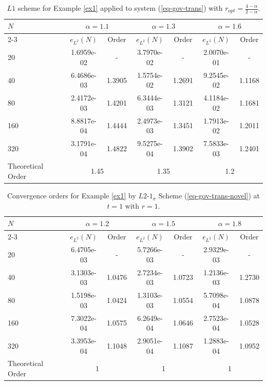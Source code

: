 \documentclass[11pt]{article}
\numberwithin{equation}{section}
\begin{document}
\begin{table}[!ht]
\caption{$L1$ scheme for Example \ref{ex1} applied to system (\ref{eq-gov-trans}) with $r_{opt}=\frac{4-\alpha}{2-\alpha}$.}\label{table2}
\renewcommand{\arraystretch}{1}
\def\temptablewidth{0.95\textwidth}
\begin{center}
 \begin{tabular*}{\temptablewidth}{@{\extracolsep{\fill}}lcccccc}\hline
 $N$  &\multicolumn{2}{c}{$\alpha=1.1$} &\multicolumn{2}{c}{$\alpha=1.3$} &\multicolumn{2}{c}{$\alpha=1.6$}\\
 \cline{2-3}\cline{4-5}\cline{6-7}
 & $e_{L^{2}}(N)$         &Order     &$e_{L^{2}}(N)$    &Order    &$e_{L^{2}}(N)$ &Order     \\ \hline  
 20  &1.6959e-02   &-       &3.7970e-02   &-        &2.0070e-01  &-    \\
 40  &6.4686e-03   &1.3905  &1.5754e-02   &1.2691   &9.2545e-02  &1.1168 \\
 80  &2.4172e-03   &1.4201  &6.3444e-03   &1.3121   &4.1184e-02  &1.1681    \\
 160 &8.8817e-04   &1.4444  &2.4973e-03   &1.3451   &1.7913e-02  &1.2011    \\
 320 &3.1791e-04   &1.4822  &9.5275e-04   &1.3902   &7.5833e-03  &1.2401    \\\hline
 Theoretical Order
 &\multicolumn{2}{c}{1.45} &\multicolumn{2}{c}{1.35}&\multicolumn{2}{c}{1.2}\\ \hline
\end{tabular*}
\end{center}
\end{table}

\iffalse
\begin{table}[!ht]
\caption{Convergence orders for Example \ref{ex1} by $L2$-$1_\sigma$ Scheme (\ref{eq-gov-trans-novel}) at $t=1$ with $r=1$.}
\renewcommand{\arraystretch}{1}
\def\temptablewidth{0.95\textwidth}
\begin{center}
 \begin{tabular*}{\temptablewidth}{@{\extracolsep{\fill}}lcccccc}\hline
 $N$  &\multicolumn{2}{c}{$\alpha=1.2$} &\multicolumn{2}{c}{$\alpha=1.5$} &\multicolumn{2}{c}{$\alpha=1.8$}\\
 \cline{2-3}\cline{4-5}\cline{6-7}
 & $e_{L^{2}}(N)$         &Order     &$e_{L^{2}}(N)$    &Order    &$e_{L^{2}}(N)$ &Order     \\ \hline  
 20  &6.4705e-03   &-       &5.7266e-03   &-        &2.9329e-03  &-  \\
 40  &3.1303e-03   &1.0476  &2.7234e-03   &1.0723   &1.2136e-03  &1.2730  \\
 80  &1.5198e-03   &1.0424  &1.3103e-03   &1.0554   &5.7098e-04  &1.0878 \\
 160 &7.3022e-04   &1.0575  &6.2649e-04   &1.0646   &2.7523e-04  &1.0528  \\
 320 &3.3953e-04   &1.1048  &2.9051e-04   &1.1087   &1.2883e-04  &1.0952  \\\hline
 Theoretical Order
 &\multicolumn{2}{c}{1} &\multicolumn{2}{c}{1}&\multicolumn{2}{c}{1}\\ \hline
\end{tabular*}
\end{center}
\end{table}
\end{document}
